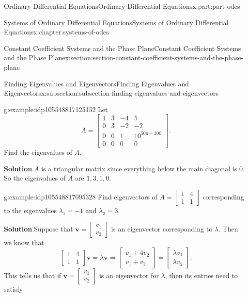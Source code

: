 \documentclass[twoside,10pt,]{book}
\newcommand{\blocktitlefont}{\relax}
\numberwithin{equation}{part}
\renewcommand{\vec}[1]{\mathbf{#1}}
\newcommand{\amp}{&}
\begin{document}
\begin{partptx}{Ordinary Differential Equations}{}{Ordinary Differential Equations}{}{}{x:part:part-odes}
\begin{chapterptx}{Systems of Ordinary Differential Equations}{}{Systems of Ordinary Differential Equations}{}{}{x:chapter:systems-of-odes}
\begin{sectionptx}{Constant Coefficient Systems and the Phase Plane}{}{Constant Coefficient Systems and the Phase Plane}{}{}{x:section:section-constant-coefficient-systems-and-the-phase-plane}
\begin{subsectionptx}{Finding Eigenvalues and Eigenvectors}{}{Finding Eigenvalues and Eigenvectors}{}{}{x:subsection:subsection-finding-eigenvalues-and-eigenvectors}
\begin{example}{}{g:example:idp105548817125152}
Let%
\begin{equation*}
A = \begin{bmatrix}1 \amp  3 \amp  -4 \amp  5 \\ 0 \amp  3 \amp  -2 \amp  -2 \\ 0 \amp  0 \amp  1 \amp  10^{50\pi-300} \\ 0 \amp  0 \amp  0 \amp  0\end{bmatrix}.
\end{equation*}
Find the eigenvalues of \(A\).%
\par\smallskip%
\noindent\textbf{\blocktitlefont Solution}.\hypertarget{g:solution:idp105548817093408}{}\quad{}\(A\) is a triangular matrix since everything below the main diagonal is \(0\). So the eigenvalues of \(A\) are \(1,3,1,0\).%
\end{example}
\begin{example}{}{g:example:idp105548817095328}%
Find eigenvectors of \(A = \begin{bmatrix}1 \amp  4 \\ 1 \amp  1\end{bmatrix}\) corresponding to the eigenvalues \(\lambda_{1} = -1\) and \(\lambda_{2} = 3\).%
\par\smallskip%
\noindent\textbf{\blocktitlefont Solution}.\hypertarget{g:solution:idp105548817096992}{}\quad{}Suppose that \(\vec{v} = \begin{bmatrix} v_{1} \\ v_{2} \end{bmatrix}\) is an eigenvector corresponding to \(\lambda\). Then we know that%
\begin{equation*}
\begin{bmatrix}1 \amp  4 \\ 1 \amp  1\end{bmatrix}\vec{v} = \lambda\vec{v} \Rightarrow \begin{bmatrix}v_{1}+4v_{2} \\ v_{1} + v_{2}\end{bmatrix} = \begin{bmatrix} \lambda v_{1} \\ \lambda v_{2} \end{bmatrix}.
\end{equation*}
This tells us that if \(\vec{v} = \begin{bmatrix}v_{1} \\ v_{2} \end{bmatrix}\) is an eigenvector for \(\lambda\), then its entries need to satisfy%
\begin{align}

\end{align}
\end{example}
\end{subsectionptx}
\end{sectionptx}
\end{chapterptx}
\end{partptx}
\end{document}
